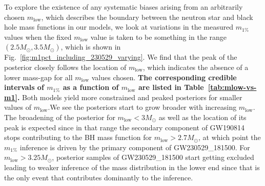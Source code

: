 \documentclass[modern]{aastex631}
\begin{document}

To explore the existence of any systematic biases arising from an arbitrarily
chosen $m_\mathrm{low}$, which describes the boundary between the
neutron star and black hole mass functions in our models, we look at variations
in the measured $m_{1\%}$ values when the fixed $m_\mathrm{low}$ value is taken
to be something in the range $(2.5M_{\odot},3.5M_{\odot})$, which is shown in
Fig.~\ref{fig:m1pct_including_230529_varying}. We find that the peak of the
posterior closely follows the location of $m_\mathrm{low}$, which indicates the
absence of a lower mass-gap for all $m_\mathrm{low}$ values chosen. \textbf{The corresponding credible intervals of $m_{1\%}$ as a function of $m_{\mathrm{low}}$ are listed in Table~\ref{tab:mlow-vs-m1}.} Both models yield more constrained and peaked posteriors for smaller values of
$m_{\mathrm{low}}$.We see the posteriors start to grow broader with increasing
$m_\mathrm{low}$. The broadening of the posterior for $m_\mathrm{low}<3M_{\odot}$ as well
as the location of its peak is expected since in that range the secondary
component of GW190814~\citep{LIGOScientific:2020zkf} stops contributing to the
BH mass function for $m_\mathrm{low}>2.7M_{\odot}$, at which point
the $m_{1\%}$ inference is driven by the primary component of
GW230529\_181500. For  $m_\mathrm{low}>3.25M_{\odot}$, posterior samples of GW230529\_181500 start
getting excluded leading to weaker inference of the mass distribution in the
lower end since that is the only event that contributes dominantly to the
inference.


\end{document}
